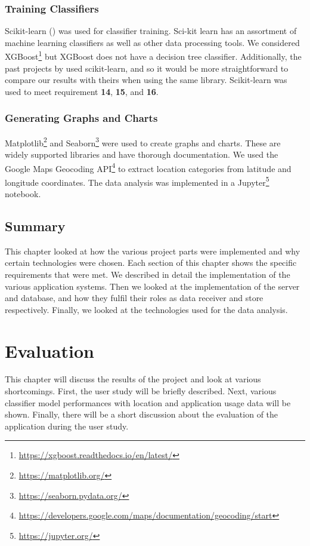 \documentclass{l4proj}
\begin{document}
\subsection{Training Classifiers}
Scikit-learn (\cite{scikit-learn, sklearn_api}) was used for classifier training. Sci-kit learn has an assortment of machine learning classifiers as well as other data processing tools. We considered XGBoost\footnote{\url{https://xgboost.readthedocs.io/en/latest/}} but XGBoost does not have a decision tree classifier. Additionally, the past projects by \cite{dimitris, wood, fox} used scikit-learn, and so it would be more straightforward to compare our results with theirs when using the same library. Scikit-learn was used to meet requirement \textbf{14}, \textbf{15}, and \textbf{16}.

\subsection{Generating Graphs and Charts}
Matplotlib\footnote{\url{https://matplotlib.org/}} and Seaborn\footnote{\url{https://seaborn.pydata.org/}} were used to create graphs and charts. These are widely supported libraries and have thorough documentation. We used the Google Maps Geocoding API\footnote{\url{https://developers.google.com/maps/documentation/geocoding/start}} to extract location categories from latitude and longitude coordinates. The data analysis was implemented in a Jupyter\footnote{\url{https://jupyter.org/}} notebook.


\section{Summary}
This chapter looked at how the various project parts were implemented and why certain technologies were chosen. Each section of this chapter shows the specific requirements that were met. We described in detail the implementation of the various application systems. Then we looked at the implementation of the server and database, and how they fulfil their roles as data receiver and store respectively. Finally, we looked at the technologies used for the data analysis. 

\chapter{Evaluation} \label{evaluation}
This chapter will discuss the results of the project and look at various shortcomings. First, the user study will be briefly described. Next, various classifier model performances with location and application usage data will be shown. Finally, there will be a short discussion about the evaluation of the application during the user study.
\end{document}
